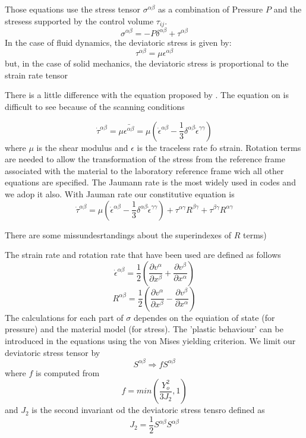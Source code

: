 \documentclass[10pt, twocolumn]{thesis}
\begin{document}
Those equations use the stress tensor $\sigma^{\alpha\beta}$ as a combination of Pressure $P$ and the stresess supported by the control volume $\tau_{ij}$.
\[\sigma^{\alpha\beta} = -P\delta^{\alpha\beta} + \tau^{\alpha\beta}\]
In the case of fluid dynamics, the deviatoric stress is given by:
\[\tau^{\alpha\beta}=\mu\epsilon^{\alpha\beta}\]
but, in the case of solid mechanics, the deviatoric stress is proportional to the strain rate tensor\cite{Luna_SPH}\cite{allahdadi93} 
\begin{scriptsize}
There is a little difference with the equation proposed by \cite{benz95}. The equation on \cite{allahdadi93} is difficult to see because of the scanning conditions
\end{scriptsize}
\[\dot{\tau}^{\alpha\beta}=\mu\bar{\epsilon^{\alpha\beta}} = \mu\left(\dot{\epsilon}^{\alpha\beta}-\frac{1}{3}\delta^{\alpha\beta}\dot{\epsilon}^{\gamma\gamma}\right)\]
where $\mu$ is the shear modulus and $\epsilon$ is the traceless rate fo strain.
Rotation terms are needed to allow the transformation of the stress from the reference frame associated with the material to the laboratory reference frame wich all other equations are specified\cite{allahdadi93}\cite{benz95}. The Jaumann rate is the most widely used in codes and we adop it also. With Jauman rate our constitutive equation is
\[\dot{\tau}^{\alpha\beta} = \mu\left(\dot{\epsilon}^{\alpha\beta}-\frac{1}{3}\delta^{\alpha\beta}\dot{\epsilon}^{\gamma\gamma}\right) + \tau^{\alpha\gamma}R^{\beta\gamma} + \tau^{\beta\gamma}R^{\alpha\gamma}\]
\begin{scriptsize}
There are some missundesrtandings about the superindexes of $R$ terms)
\end{scriptsize}
The strain rate and rotation rate that have been used are defined as follows\cite{allahdadi93}\cite{benz95}
\[\dot{\epsilon}^{\alpha\beta}=\frac{1}{2}\left(\frac{\partial v^\alpha}{\partial x^\beta} + \frac{\partial v^\beta}{\partial x^\alpha}\right)\]
\[R^{\alpha\beta}=\frac{1}{2}\left(\frac{\partial v^\alpha}{\partial x^\beta} - \frac{\partial v^\beta}{\partial x^\alpha}\right)\]
The calculations for each part of $\sigma$ dependes on the equiation of state (for pressure) and the material model (for stress).
The 'plastic behaviour' can be introduced in the equations using the von Mises yielding criterion. We limit our deviatoric stress tensor by\cite{benz95}
\[S^{\alpha\beta}\Rightarrow fS^{\alpha\beta}\]
where $f$ is computed from
\[f=min\left(\frac{Y_o^2}{3J_2},1\right)\]
and $J_2$ is the second invariant od the deviatoric stress tensro defined as
\[J_2=\frac{1}{2}S^{\alpha\beta}S^{\alpha\beta}\]
\end{document}
